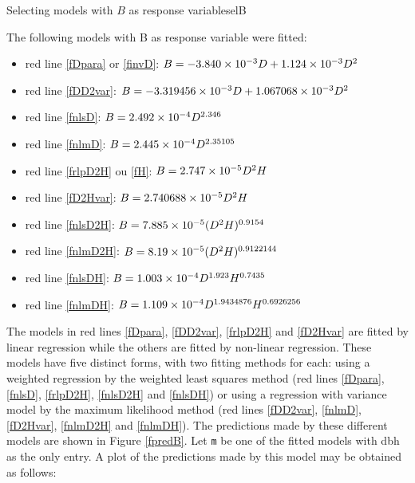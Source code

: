 \begin{filrouge}{Selecting models with $B$ as response variable}{selB}%

The following models with B as response variable were fitted:

\begin{itemize}
\item red line \ref{fDpara} or \ref{finvD}: $B=-\mbox{3.840}\times10^{-3}D+\mbox{1.124}\times10^{-3}D^2$
\item red line \ref{fDD2var}: $B=-\mbox{3.319456}\times10^{-3}D+\mbox{1.067068}\times10^{-3}D^2$
\item red line \ref{fnlsD}: $B=\mbox{2.492}\times10^{-4}D^{2.346}$
\item red line \ref{fnlmD}: $B=\mbox{2.445}\times10^{-4}D^{2.35105}$
\item red line \ref{frlpD2H} ou \ref{fH}: $B=\mbox{2.747}\times10^{-5}D^2H$
\item red line \ref{fD2Hvar}: $B=\mbox{2.740688}\times10^{-5}D^2H$
\item red line \ref{fnlsD2H}: $B=\mbox{7.885}\times10^{-5}(D^2H)^{0.9154}$
\item red line \ref{fnlmD2H}: $B=\mbox{8.19}\times10^{-5}(D^2H)^{0.9122144}$
\item red line \ref{fnlsDH}: $B=\mbox{1.003}\times10^{-4}D^{1.923}H^{0.7435}$
\item red line \ref{fnlmDH}: $B=\mbox{1.109}\times10^{-4}D^{1.9434876}H^{0.6926256}$
\end{itemize}
The models in red lines \ref{fDpara}, \ref{fDD2var}, \ref{frlpD2H} and \ref{fD2Hvar} are fitted by linear regression while the others are fitted by non-linear regression. These models have five distinct forms, with two fitting methods for each: using a weighted regression by the weighted least squares method (red lines \ref{fDpara}, \ref{fnlsD}, \ref{frlpD2H}, \ref{fnlsD2H} and \ref{fnlsDH}) or using a regression with variance model by the maximum likelihood method (red lines \ref{fDD2var}, \ref{fnlmD}, \ref{fD2Hvar}, \ref{fnlmD2H}
and \ref{fnlmDH}). The predictions made by these different models are shown in  Figure \ref{fpredB}. Let \texttt{m} be one of the fitted models with dbh as the only entry. A plot of the predictions made by this model may be obtained as follows:
%

\end{filrouge}
